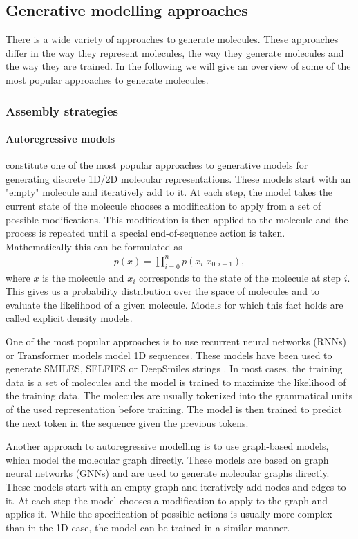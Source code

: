 \subsection{Generative modelling approaches}
There is a wide variety of approaches to generate molecules. These approaches
differ in the way they represent molecules, the way they generate molecules
and the way they are trained. In the following we will give an overview of
some of the most popular approaches to generate molecules. 

\subsubsection{Assembly strategies}
\paragraph{Autoregressive models} constitute one of the most popular approaches
to generative models for generating discrete 1D/2D molecular representations. 
These models start with an "empty" molecule and iteratively add to it. 
At each step, the model takes the current state of the molecule chooses 
a modification to apply from a set of possible modifications. This modification
is then applied to the molecule and the process is repeated until a special
end-of-sequence action is taken. Mathematically this can be formulated as
\begin{align}
    p(x) = \prod_{i=0}^n p(x_i | x_{0:i-1}), 
\end{align}
where $x$ is the molecule and $x_i$ corresponds to the state of the molecule 
at step $i$. This gives us a probability distribution over the space of molecules
and to evaluate the likelihood of a given molecule. Models for which this fact 
holds are called explicit density models.

One of the most popular approaches is to use recurrent neural networks (RNNs)
or Transformer models \citep{vaswaniAttentionAllYou2017} model 1D sequences.
These models have been used to generate SMILES, SELFIES or DeepSmiles strings
\citep{seglerGeneratingFocusedMolecule2018,todo}. 
In most cases, the training data is a set of molecules and the model is trained
to maximize the likelihood of the training data. The molecules are usually
tokenized into the grammatical units of the used representation before training. 
The model is then trained to predict the next token in the sequence given the
previous tokens.

Another approach to autoregressive modelling is to use graph-based models, which
model the molecular graph directly. These models are based on graph neural
networks (GNNs) and are used to generate molecular graphs directly. 
These models start with an empty graph and iteratively add nodes and edges to
it. At each step the model chooses a modification to apply to the graph and
applies it. While the specification of possible actions is usually more 
complex than in the 1D case, the model can be trained in a similar manner.

